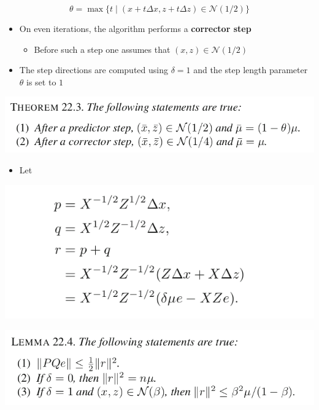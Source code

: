 \documentclass[11pt]{article}
\begin{document}
\begin{equation}
	\theta = \max \{t \mid (x+t \Delta x, z + t\Delta z) \in \mathcal N(1/2)\} 
\end{equation}
\begin{itemize}
\item On even iterations, the algorithm performs a \textbf{corrector step}
\begin{itemize}
\item Before such a step one assumes that \((x,z) \in \mathcal N (1/2)\)
\end{itemize}
\item The step directions are computed using \(\delta = 1\) and the step length parameter \(\theta\) is set to \(1\)
\end{itemize}
\begin{center}
\includegraphics[width=.9\linewidth]{The Homogeneous Self-Dual Method/screenshot_2019-03-11_18-31-57.png}
\end{center}

\begin{itemize}
\item Let
\end{itemize}
\begin{center}
\includegraphics[width=.9\linewidth]{The Homogeneous Self-Dual Method/screenshot_2019-03-11_18-34-34.png}
\end{center}

\begin{center}
\includegraphics[width=.9\linewidth]{The Homogeneous Self-Dual Method/screenshot_2019-03-11_18-34-53.png}
\end{center} 
\end{document}
